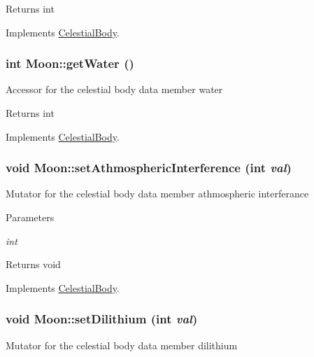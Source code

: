 \begin{DoxyReturn}{Returns}
int 
\end{DoxyReturn}


Implements \hyperlink{classCelestialBody}{CelestialBody}.

\hypertarget{classMoon_a6d687ec0a5f6437b0af4615241afe94f}{
\subsubsection[{getWater}]{\setlength{\rightskip}{0pt plus 5cm}int Moon::getWater ()}}
\label{d8/d6f/classMoon_a6d687ec0a5f6437b0af4615241afe94f}
Accessor for the celestial body data member water

\begin{DoxyReturn}{Returns}
int 
\end{DoxyReturn}


Implements \hyperlink{classCelestialBody}{CelestialBody}.

\hypertarget{classMoon_a1088a8f3e7198b38d9ce498f9f6243a9}{
\subsubsection[{setAthmosphericInterference}]{\setlength{\rightskip}{0pt plus 5cm}void Moon::setAthmosphericInterference (int {\em val})}}
\label{d8/d6f/classMoon_a1088a8f3e7198b38d9ce498f9f6243a9}
Mutator for the celestial body data member athmospheric interferance


\begin{DoxyParams}{Parameters}
\item[{\em int}]\end{DoxyParams}
\begin{DoxyReturn}{Returns}
void 
\end{DoxyReturn}


Implements \hyperlink{classCelestialBody}{CelestialBody}.

\hypertarget{classMoon_ab73d920601c3f398cb23b2d78f816f49}{
\subsubsection[{setDilithium}]{\setlength{\rightskip}{0pt plus 5cm}void Moon::setDilithium (int {\em val})}}
\label{d8/d6f/classMoon_ab73d920601c3f398cb23b2d78f816f49}
Mutator for the celestial body data member dilithium



